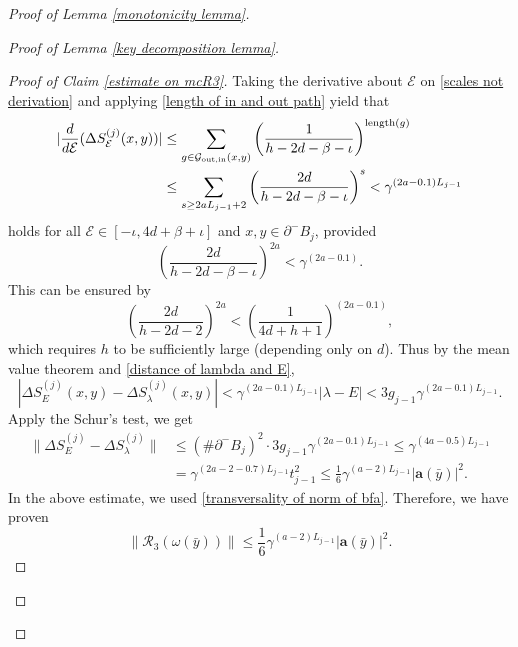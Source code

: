 \documentclass[11pt,reqno,UTF8,twoside]{amsart}
\newcommand{\length}{{\rm length}}
\newcommand{\bfa}{\mathbf{a}}
\newcommand{\mcE}{\mathcal{E}}
\newcommand{\mcR}{\mathcal{R}}
\newcommand{\mcG}{\mathcal{G}}
\newcommand{\diffSj}{\Delta {S}^{(j)}}
\theoremstyle{definition}
\numberwithin{equation}{section}
\begin{document}
\begin{proof}[Proof of Lemma \ref{monotonicity lemma}]
\begin{proof}[Proof of Lemma \ref{key decomposition lemma}]
\begin{proof}[Proof of Claim \ref{estimate on mcR3}]
Taking the  derivative  about $\mcE$ on \eqref{scales not derivation} and applying \eqref{length of in and out path} yield  that 
\begin{align*}
  |\frac{d}{d \mcE} (\diffSj_{\mcE}(x,y))| & \leq \sum_{g\in \mcG_{\text{out,in}}(x,y) } \left(\frac{1}{h-2d-\beta-\iota}\right) ^{\length(g)} \\
     &\leq \sum_{s\geq 2aL_{j-1}+2}  \left(\frac{2d}{h-2d-\beta-\iota}\right) ^s <\gamma^{(2a-0.1)L_{j-1}}
\end{align*}
holds for all $\mcE\in [-\iota,4d+\beta+\iota]$ and $x,y\in \partial^-B_j$,  provided 
\[ \left(\frac{2d}{h-2d-\beta-\iota}\right)^{2a}< \gamma^{(2a-0.1)}. \]
This can be ensured by 
\begin{equation}\label{essential barrier high 4}
  \left(\frac{2d}{h-2d-2}\right)^{2a}< \left(\frac{1}{4d+h+1}\right)^{(2a-0.1)},
\end{equation}
which requires $h$ to be sufficiently large (depending only on $d$). Thus by the mean value theorem and \eqref{distance of lambda and E},  
\[ |\diffSj_{E}(x,y)-\diffSj_{\lambda}(x,y)| < \gamma^{(2a-0.1)L_{j-1}} |\lambda-E| < 3 g_{j-1} \gamma^{(2a-0.1)L_{j-1}} .\]
Apply the Schur's  test, we get  
\begin{align*}
  \| \diffSj_E-\diffSj_{\lambda}  \|& \leq (\# \partial^-B_j)^2 \cdot 3 g_{j-1} \gamma^{(2a-0.1)L_{j-1}} \leq   \gamma^{(4a-0.5)L_{j-1}} \\
     & = \gamma^{(2a-2-0.7)L_{j-1}} t^2_{j-1} \leq \frac{1}{6} \gamma^{(a-2)L_{j-1}} |\bfa(\bar{y})|^2.
\end{align*}
In the above estimate, we used \eqref{transversality of norm of bfa}. Therefore, we  have proven   
\begin{equation}\label{bound on first part of mcR3}
  \|\mcR_3(\omega(\bar{y})) \| \leq \frac{1}{6}\gamma^{(a-2)L_{j-1}} |\bfa(\bar{y})|^2.
\end{equation}
\end{proof}



\end{proof}
\end{proof}
\end{document}
